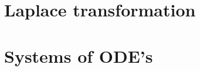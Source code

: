\documentclass[a4paper]{book} %
\begin{document}
\chapter{Laplace transformation}

\chapter{Systems of ODE's}

\appendix
%
%

\end{document}
